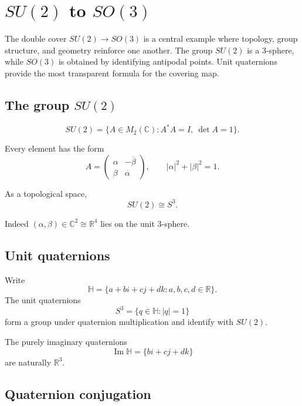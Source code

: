 ﻿\chapter{\texorpdfstring{\(SU(2)\) to \(SO(3)\)}{SU(2) to SO(3)}}
\label{ch:viii13-su2-so3}

The double cover \(SU(2)\to SO(3)\) is a central example where topology,
group structure, and geometry reinforce one another.  The group \(SU(2)\) is
a 3-sphere, while \(SO(3)\) is obtained by identifying antipodal points.  Unit
quaternions provide the most transparent formula for the covering map.

\section{The group \(SU(2)\)}

\begin{definition}
\label{def:viii13-su2}
\[
SU(2)=\{A\in M_2(\mathbb C):A^*A=I,\ \det A=1\}.
\]
\end{definition}

Every element has the form
\[
A=
\begin{pmatrix}
\alpha&-\overline\beta\\
\beta&\overline\alpha
\end{pmatrix},
\qquad
|\alpha|^2+|\beta|^2=1.
\]

\begin{proposition}
\label{prop:viii13-s3}
As a topological space,
\[
SU(2)\cong S^3.
\]
\end{proposition}

Indeed \((\alpha,\beta)\in\mathbb C^2\cong\mathbb R^4\) lies on the unit
3-sphere.

\section{Unit quaternions}

Write
\[
\mathbb H=\{a+bi+cj+dk:a,b,c,d\in\mathbb R\}.
\]
The unit quaternions
\[
S^3=\{q\in\mathbb H:|q|=1\}
\]
form a group under quaternion multiplication and identify with \(SU(2)\).

The purely imaginary quaternions
\[
\operatorname{Im}\mathbb H=\{bi+cj+dk\}
\]
are naturally \(\mathbb R^3\).

\section{Quaternion conjugation}

